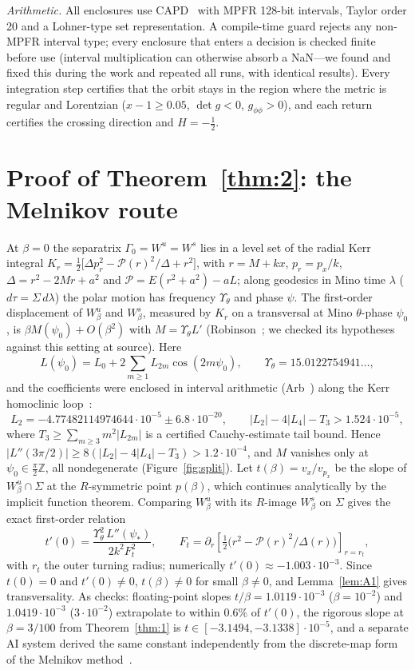 \documentclass[11pt]{amsart}
\theoremstyle{remark}\newtheorem*{remark}{Remark}
\begin{document}
\emph{Arithmetic.} All enclosures use CAPD~\cite{CAPD} with MPFR 128-bit intervals, Taylor order 20 and a
Lohner-type set representation. A compile-time guard rejects any non-MPFR interval type; every enclosure that enters a
decision is checked finite before use (interval multiplication can otherwise absorb a NaN---we found and fixed this
during the work and repeated all runs, with identical results). Every integration step certifies that the orbit stays
in the region where the metric is regular and Lorentzian ($x-1\ge0.05$, $\det g<0$, $g_{\phi\phi}>0$), and each return
certifies the crossing direction and $H=-\tfrac12$.

\section{Proof of Theorem~\ref{thm:2}: the Melnikov route}
At $\beta=0$ the separatrix $\Gamma_0=W^u=W^s$ lies in a level set of the radial Kerr integral
$K_r=\tfrac12\big[\Delta p_r^2-\mathcal P(r)^2/\Delta+r^2\big]$, with $r=M+kx$, $p_r=p_x/k$, $\Delta=r^2-2Mr+a^2$ and
$\mathcal P=E(r^2+a^2)-aL$; along geodesics in Mino time $\lambda$ ($d\tau=\Sigma\,d\lambda$) the polar motion has
frequency $\Upsilon_\theta$ and phase $\psi$. The first-order
displacement of $W^u_\beta$ and $W^s_\beta$, measured by $K_r$ on a transversal at Mino $\theta$-phase $\psi_0$, is
$\beta M(\psi_0)+O(\beta^2)$ with $M=\Upsilon_\theta L'$ (Robinson~\cite[Thm.~3.4, Rem.~3.10]{Robinson}; we checked its
hypotheses against this setting at source). Here
\[ L(\psi_0)=L_0+2\sum_{m\ge1}L_{2m}\cos(2m\psi_0),\qquad \Upsilon_\theta=15.0122754941\ldots, \]
and the coefficients were enclosed in interval arithmetic (Arb~\cite{Arb}) along the Kerr homoclinic loop~\cite{MelRes}:
\[ L_2=-4.77482114974644\cdot10^{-5}\pm6.8\cdot10^{-20},\qquad |L_2|-4|L_4|-T_3>1.524\cdot10^{-5}, \]
where $T_3\ge\sum_{m\ge3}m^2|L_{2m}|$ is a certified Cauchy-estimate tail bound. Hence
$|L''(3\pi/2)|\ge8(|L_2|-4|L_4|-T_3)>1.2\cdot10^{-4}$, and $M$ vanishes only at $\psi_0\in\frac\pi2\mathbb Z$, all
nondegenerate (Figure~\ref{fig:split}). Let $t(\beta)=v_x/v_{p_x}$ be the slope of $W^u_\beta\cap\Sigma$ at the
$R$-symmetric point $p(\beta)$, which continues analytically by the implicit function theorem. Comparing $W^u_\beta$
with its $R$-image $W^s_\beta$ on $\Sigma$ gives the exact first-order relation
\[ t'(0)=\frac{\Upsilon_\theta^{2}\,L''(\psi_*)}{2k^2F_t^2},\qquad F_t=\partial_r\!\left[\tfrac12\big(r^2-\mathcal P(r)^2/\Delta(r)\big)\right]_{r=r_t}, \]
with $r_t$ the outer turning radius; numerically $t'(0)\approx-1.003\cdot10^{-3}$. Since $t(0)=0$ and $t'(0)\neq0$,
$t(\beta)\neq0$ for small $\beta\neq0$, and Lemma~\ref{lem:A1} gives transversality. As checks: floating-point slopes
$t/\beta=1.0119\cdot10^{-3}$ ($\beta=10^{-2}$) and $1.0419\cdot10^{-3}$ ($3\cdot10^{-2}$) extrapolate to within
$0.6\%$ of $t'(0)$, the rigorous slope at $\beta=3/100$ from Theorem~\ref{thm:1} is $t\in[-3.1494,-3.1338]\cdot10^{-5}$,
and a separate AI system derived the same constant independently from the discrete-map form of the Melnikov
method~\cite{DRR}.
\end{document}
